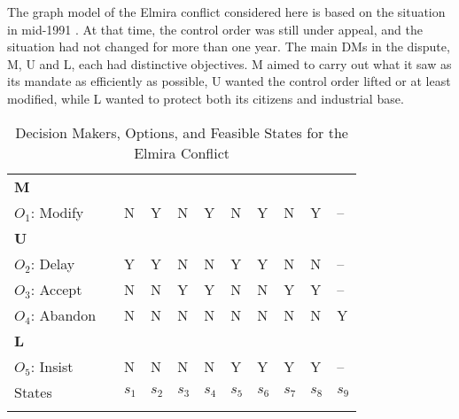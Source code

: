 The graph model of the Elmira conflict considered here is based on the situation in mid-1991 \citep{Hipel-et-al1993a}. At that time, the control order was still under appeal, and the situation had not changed for more than one year. The main DMs in the dispute, M, U and L, each had distinctive objectives. M aimed to carry out what it saw as its mandate as efficiently as possible, U wanted the control order lifted or at least modified, while L wanted to protect both its citizens and industrial base.

\begin{table}[h]
\centering
\caption{Decision Makers, Options, and Feasible States for the Elmira Conflict}
\small
\setlength{\tabcolsep}{3pt}
\renewcommand{\arraystretch}{1.1}

\begin{tabular}[t]{lx{4mm}x{10mm}x{10mm}x{10mm}x{10mm}x{10mm}x{10mm}x{10mm}x{10mm}x{10mm}}


   {\bf M}        & &   &   &   &   &   &   &   &   &    \\
   $O_1$: Modify  & & N & Y & N & Y & N & Y & N & Y & -- \\
   {\bf U}        & &   &   &   &   &   &   &   &   &    \\
   $O_2$: Delay   & & Y & Y & N & N & Y & Y & N & N & -- \\
   $O_3$: Accept  & & N & N & Y & Y & N & N & Y & Y & -- \\
   $O_4$: Abandon & & N & N & N & N & N & N & N & N & Y  \\
   {\bf L}        & &   &   &   &   &   &   &   &   &    \\
   $O_5$: Insist  & & N & N & N & N & Y & Y & Y & Y & -- \\[0.5mm]

   States     & & $s_1$ & $s_2$ & $s_3$ & $s_4$ & $s_5$ & $s_6$ & $s_7$ & $s_8$ & $s_9$ \\[0.5mm]

\end{tabular}
\label{tbl-dm-ops-sts}
\end{table}

